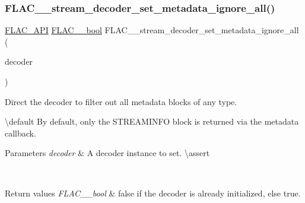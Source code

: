\subsubsection{\texorpdfstring{FLAC\_\_stream\_decoder\_set\_metadata\_ignore\_all()}{FLAC\_\_stream\_decoder\_set\_metadata\_ignore\_all()}}
{\footnotesize\ttfamily \mbox{\hyperlink{group__flac__export_ga56ca07df8a23310707732b1c0007d6f5}{F\+L\+A\+C\+\_\+\+A\+PI}} \mbox{\hyperlink{ordinals_8h_a95103469f1cbd78b8cf250194985b34e}{F\+L\+A\+C\+\_\+\+\_\+bool}} F\+L\+A\+C\+\_\+\+\_\+stream\+\_\+decoder\+\_\+set\+\_\+metadata\+\_\+ignore\+\_\+all (\begin{DoxyParamCaption}\item[{\mbox{\hyperlink{struct_f_l_a_c_____stream_decoder}{F\+L\+A\+C\+\_\+\+\_\+\+Stream\+Decoder}} $\ast$}]{decoder }\end{DoxyParamCaption})}

Direct the decoder to filter out all metadata blocks of any type.

\textbackslash{}default By default, only the {\ttfamily S\+T\+R\+E\+A\+M\+I\+N\+FO} block is returned via the metadata callback. 
\begin{DoxyParams}{Parameters}
{\em decoder} & A decoder instance to set. \textbackslash{}assert 
\begin{DoxyCode}{1}
\end{DoxyCode}
 \\
\hline
\end{DoxyParams}

\begin{DoxyRetVals}{Return values}
{\em F\+L\+A\+C\+\_\+\+\_\+bool} & {\ttfamily false} if the decoder is already initialized, else {\ttfamily true}. \\
\hline
\end{DoxyRetVals}
\mbox{\label{group__flac__stream__decoder_gac5eb8b3cb8df3afe788046317fbe9fb6}} 
